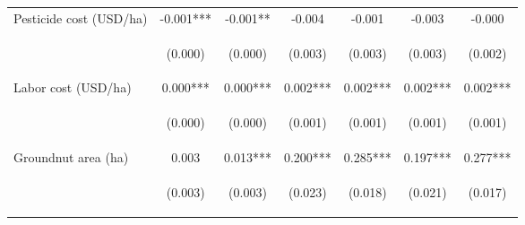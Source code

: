 \begin{center}
\begin{tabular}{lcccccc}
Pesticide cost (USD/ha) & -0.001*** & -0.001** & -0.004 & -0.001 & -0.003 & -0.000 \\
\vspace{4pt} & \begin{footnotesize}(0.000)\end{footnotesize} & \begin{footnotesize}(0.000)\end{footnotesize} & \begin{footnotesize}(0.003)\end{footnotesize} & \begin{footnotesize}(0.003)\end{footnotesize} & \begin{footnotesize}(0.003)\end{footnotesize} & \begin{footnotesize}(0.002)\end{footnotesize} \\
Labor cost (USD/ha) & 0.000*** & 0.000*** & 0.002*** & 0.002*** & 0.002*** & 0.002*** \\
\vspace{4pt} & \begin{footnotesize}(0.000)\end{footnotesize} & \begin{footnotesize}(0.000)\end{footnotesize} & \begin{footnotesize}(0.001)\end{footnotesize} & \begin{footnotesize}(0.001)\end{footnotesize} & \begin{footnotesize}(0.001)\end{footnotesize} & \begin{footnotesize}(0.001)\end{footnotesize} \\
Groundnut area (ha) & 0.003 & 0.013*** & 0.200*** & 0.285*** & 0.197*** & 0.277*** \\
\vspace{4pt} & \begin{footnotesize}(0.003)\end{footnotesize} & \begin{footnotesize}(0.003)\end{footnotesize} & \begin{footnotesize}(0.023)\end{footnotesize} & \begin{footnotesize}(0.018)\end{footnotesize} & \begin{footnotesize}(0.021)\end{footnotesize} & \begin{footnotesize}(0.017)\end{footnotesize} \\

\end{tabular}
\end{center}
